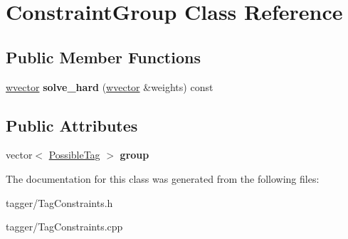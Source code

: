 \hypertarget{classConstraintGroup}{
\section{ConstraintGroup Class Reference}
\label{classConstraintGroup}
}
\subsection*{Public Member Functions}
\begin{DoxyCompactItemize}
\item 
\hypertarget{classConstraintGroup_a4f37823a56e405c16148c0ba6ae7f114}{
\hyperlink{classsvector}{wvector} {\bfseries solve\_\-hard} (\hyperlink{classsvector}{wvector} \&weights) const }
\label{classConstraintGroup_a4f37823a56e405c16148c0ba6ae7f114}

\end{DoxyCompactItemize}
\subsection*{Public Attributes}
\begin{DoxyCompactItemize}
\item 
\hypertarget{classConstraintGroup_ac96c45d3b2c4c1a6e1068837bc024d9c}{
vector$<$ \hyperlink{structPossibleTag}{PossibleTag} $>$ {\bfseries group}}
\label{classConstraintGroup_ac96c45d3b2c4c1a6e1068837bc024d9c}

\end{DoxyCompactItemize}


The documentation for this class was generated from the following files:\begin{DoxyCompactItemize}
\item 
tagger/TagConstraints.h\item 
tagger/TagConstraints.cpp\end{DoxyCompactItemize}
